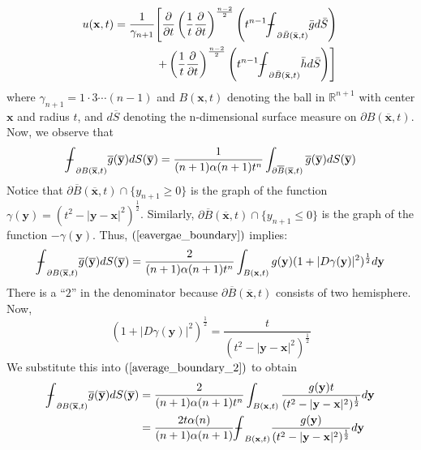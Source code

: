 \documentclass[10pt]{article}
\def\rr{{\mathbb R}}
\def\vc{{\mathbf x}}
\def\vcc{{\mathbf y}}
\newcommand\tbbint{{-\mkern -16mu\int}}
\newcommand\dbbint{{-\mkern -19mu\int}}
\newcommand\bbint{
{\mathchoice{\dbbint}{\tbbint}{\tbbint}{\tbbint}}
}
\begin{document}
$$
\begin{aligned}
u(\vc, t)=\frac{1}{\gamma_{n+1}} & {\left[\frac{\partial}{\partial t}\left(\frac{1}{t} \frac{\partial}{\partial t}\right)^{\frac{n-2}{2}}\left(t^{n-1} \bbint_{\partial \bar{B}(\bar{\vc}, t)} \bar{g} d \bar{S}\right)\right.} \\
& \left.+\left(\frac{1}{t} \frac{\partial}{\partial t}\right)^{\frac{n-2}{2}}\left(t^{n-1} \bbint_{\partial \bar{B}(\bar{\vc}, t)} \bar{h} d \bar{S}\right)\right]
\end{aligned}
$$
where $\gamma_{n+1} = 1 \cdot 3 \cdots (n-1)$ and $B(\vc,t)$ denoting the ball in $\rr^{n+1}$ with center $\vc$ and radius $t$, and $d \overline{S}$ denoting the n-dimensional surface measure on $\partial B(\overline{\vc},t)$. Now, we observe that
\begin{equation}
    \label{eavergae_boundary}
    \bbint_{\partial B(\overline{\vc},t)}\overline{g}(\overline{\vcc})dS(\overline{\vcc}) = \frac{1}{(n+1)\alpha(n+1)t^n}\int_{\partial \overline{B}(\overline{\vc},t)}\overline{g}(\overline{\vcc})dS(\overline{\vcc})
\end{equation}
Notice that $\partial \overline{B}(\overline{\vc},t) \cap \{y_{n+1} \geq 0\}$ is the graph of the function $\gamma(\vcc) = (t^2 -|\vcc-\vc|^2)^{\frac{1}{2}}$. Similarly, $\partial \overline{B}(\overline{\vc},t) \cap \{y_{n+1} \leq 0\}$ is the graph of the function $-\gamma(\vcc) $. Thus, $(\ref{eavergae_boundary})$ implies:
\begin{equation}
    \label{average_boundary_2}
    \bbint_{\partial B(\overline{\vc},t)}\overline{g}(\overline{\vcc})dS(\overline{\vcc}) = \frac{2}{(n+1)\alpha(n+1)t^n}\int_{B(\vc,t)}{g}(\vcc)(1+|D \gamma(\vcc)|^2)^{\frac{1}{2}}d\vcc
\end{equation}
There is a ``$2$'' in the denominator because $\partial \overline{B}(\overline{\vc},t)$ consists of two hemisphere. Now,
\begin{equation*}
    (1+|D \gamma (\vcc)|^2)^{\frac{1}{2}} = \frac{t}{(t^2 - |\vcc-\vc|^2)^{\frac{1}{2}}}
\end{equation*}
We substitute this into $(\ref{average_boundary_2})$ to obtain
\begin{align*}
    \bbint_{\partial B(\overline{\vc},t)}\overline{g}(\overline{\vcc})dS(\overline{\vcc}) &= \frac{2}{(n+1)\alpha(n+1)t^n}\int_{B(\vc,t)}\frac{g(\vcc)t}{(t^2 - |\vcc-\vc|^2)^{\frac{1}{2}}}d\vcc \\
    & = \frac{2 t \alpha(n)}{(n+1)\alpha(n+1)}\bbint_{B(\vc,t)}\frac{g(\vcc)}{(t^2 - |\vcc-\vc|^2)^{\frac{1}{2}}}d\vcc \\
\end{align*}
\end{document}
